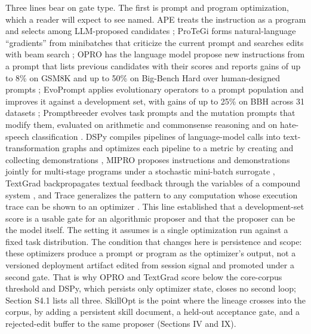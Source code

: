 \documentclass[
]{article}
\begin{document}
Three lines bear on gate type. The first is prompt and program
optimization, which a reader will expect to see named. APE treats the
instruction as a program and selects among LLM-proposed candidates
\cite{zhou2022ape}; ProTeGi forms natural-language ``gradients'' from
minibatches that criticize the current prompt and searches edits with
beam search \cite{pryzant2023protegi}; OPRO has the language model
propose new instructions from a prompt that lists previous candidates
with their scores and reports gains of up to 8\% on GSM8K and up to 50\%
on Big-Bench Hard over human-designed prompts \cite{yang2023opro};
EvoPrompt applies evolutionary operators to a prompt population and
improves it against a development set, with gains of up to 25\% on BBH
across 31 datasets \cite{guo2023evoprompt}; Promptbreeder evolves task
prompts and the mutation prompts that modify them, evaluated on
arithmetic and commonsense reasoning and on hate-speech classification
\cite{fernando2023promptbreeder}. DSPy compiles pipelines of
language-model calls into text-transformation graphs and optimizes each
pipeline to a metric by creating and collecting demonstrations
\cite{khattab2023dspy}, MIPRO proposes instructions and demonstrations
jointly for multi-stage programs under a stochastic mini-batch surrogate
\cite{opsahlong2024miprov2}, TextGrad backpropagates textual feedback
through the variables of a compound system
\cite{yuksekgonul2024textgrad}, and Trace generalizes the pattern to
any computation whose execution trace can be shown to an optimizer
\cite{cheng2024trace}. This line established that a development-set
score is a usable gate for an algorithmic proposer and that the proposer
can be the model itself. The setting it assumes is a single optimization
run against a fixed task distribution. The condition that changes here
is persistence and scope: these optimizers produce a prompt or program
as the optimizer's output, not a versioned deployment artifact edited
from session signal and promoted under a second gate. That is why OPRO
and TextGrad score below the core-corpus threshold and DSPy, which
persists only optimizer state, closes no second loop; Section S4.1 lists
all three. SkillOpt is the point where the lineage crosses into the
corpus, by adding a persistent skill document, a held-out acceptance
gate, and a rejected-edit buffer to the same proposer (Sections IV and
IX).
\end{document}
